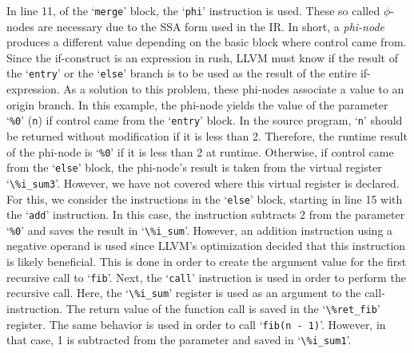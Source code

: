 In line 11, of the `\texttt{merge}' block, the `\texttt{phi}' instruction is used.
These so called $\phi$-nodes are necessary due to the SSA form used in the IR\@.
In short, a \emph{phi-node} produces a different value depending on the basic block where control came from.
Since the if-construct is an expression in rush, LLVM must know if the result of the `\texttt{entry}' or the `\texttt{else}' branch is to be used as the result of the entire if-expression.
As a solution to this problem, these phi-nodes associate a value to an origin branch.
In this example, the phi-node yields the value of the parameter `\texttt{\%0}' (\texttt{n}) if control came from the `\texttt{entry}' block.
In the source program, `\texttt{n}' should be returned without modification if it is less than 2.
Therefore, the runtime result of the phi-node is `\texttt{\%0}' if it is less than 2 at runtime.
Otherwise, if control came from the `\texttt{else}' block, the phi-node's result is taken from the virtual register `\Verb|\%i_sum3|'.
However, we have not covered where this virtual register is declared.
For this, we consider the instructions in the `\texttt{else}' block, starting in line 15 with the `\texttt{add}' instruction.
In this case, the instruction subtracts 2 from the parameter `\texttt{\%0}' and saves the result in `\Verb|\%i_sum|'.
However, an addition instruction using a negative operand is used since LLVM's optimization decided that this instruction is likely beneficial.
This is done in order to create the argument value for the first recursive call to `\texttt{fib}'.
Next, the `\texttt{call}' instruction is used in order to perform the recursive call.
Here, the `\Verb|\%i_sum|' register is used as an argument to the call-instruction.
The return value of the function call is saved in the `\Verb|\%ret_fib|' register.
The same behavior is used in order to call `\texttt{fib(n - 1)}'.
However, in that case, 1 is subtracted from the parameter and saved in `\Verb|\%i_sum1|'.

